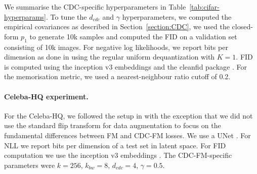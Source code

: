 \documentclass{article} %
\begin{document}
We summarise the CDC-specific hyperparameters in Table~\ref{tab:cifar-hyperparams}. To tune the $d_{cdc}$ and $\gamma$ hyperparameters, we computed the empirical covariances as described in Section~\ref{section:CDC}, we used the closed-form $p_1$ to generate 10k samples and computed the FID on a validation set consisting of 10k images. For negative log likelihoods, we report bits per dimension as done in \cite{lipman_flow_2024} using the regular uniform dequantization with $K=1$. FID is computed using the inception v3 embeddings \citep{szegedy2016rethinking} and the cleanfid package \citep{parmar2021cleanfid}.
For the memorisation metric, we used a nearest-neighbour ratio cutoff of 0.2. 


\paragraph{Celeba-HQ experiment.} For the Celeba-HQ, we followed the setup in \cite{dao2023flow} with the exception that we did not use the standard flip transform for data augmentation to focus on the fundamental differences between FM and CDC-FM losses. We use a UNet \citep{dhariwal2021diffusion}. For NLL we report bits per dimension of a test set in latent space. For FID computation we use the inception v3 embeddings \citep{szegedy2016rethinking}. The CDC-FM-specific parameters were $k=256$, $k_{bw}=8$, $d_{cdc}=4$, $\gamma=0.5$.
\end{document}
